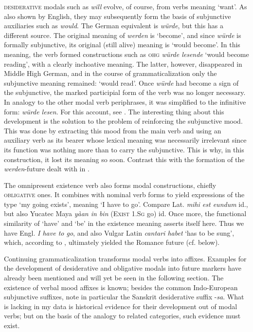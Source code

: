 \textsc{desiderative} modals such as \textit{will} evolve, of course, from verbs meaning ‘want’. As also shown by English, they may subsequently form the basis of subjunctive auxiliaries such as \textit{would}. The German equivalent is \textit{würde}, but this has a different source. The original meaning of \textit{werden} is ‘become’, and since \textit{würde} is formally subjunctive, its original (still alive) meaning is ‘would become’. In this meaning, the verb formed constructions such as \textsc{ohg} \textit{würde lesende} ‘would become reading’, with a clearly inchoative meaning. The latter, however, disappeared in Middle High German, and in the course of grammaticalization only the subjunctive meaning remained: ‘would read’. Once \textit{würde} had become a sign of the subjunctive, the marked participial form of the verb was no longer necessary. In analogy to the other modal verb periphrases, it was simplified to the infinitive form: \textit{würde lesen}. For this account, see \citet[60f]{Ronneberger-Sibold1980}. The interesting thing about this development is the solution to the problem of reinforcing the subjunctive mood. This was done by extracting this mood from the main verb and using an auxiliary verb as its bearer whose lexical meaning was necessarily irrelevant since its function was nothing more than to carry the subjunctive. This is why, in this construction, it lost its meaning so soon. Contrast this with the formation of the \textit{werden}{}-future dealt with in .

The omnipresent existence verb also forms modal constructions, chiefly \textsc{obli\-gative} ones. It combines with nominal verb forms to yield expressions of the type ‘my going exists’, meaning ‘I have to go’. Compare Lat. \textit{mihi est eundum} id., but also Yucatec Maya \textit{yàan in bin} (\textsc{Exist} 1.\textsc{Sg} go) id. Once more, the functional similarity of ‘have’ and ‘be’ in the existence meaning asserts itself here. Thus we have Engl. \textit{I have to go}, and also Vulgar Latin \textit{cantari habet} ‘has to be sung’, which, according to \citet[§\textsc{ii}]{Benveniste1968}, ultimately yielded the Romance future (cf. below).

Continuing grammaticalization transforms modal verbs into affixes. Examples for the development of desiderative and obligative modals into future markers have already been mentioned and will yet be seen in the following section. The existence of verbal mood affixes is known; besides the common Indo-European subjunctive suffixes, note in particular the Sanskrit desiderative suffix -\textit{sa}. What is lacking in my data is historical evidence for their development out of modal verbs; but on the basis of the analogy to related categories, such evidence must exist.

